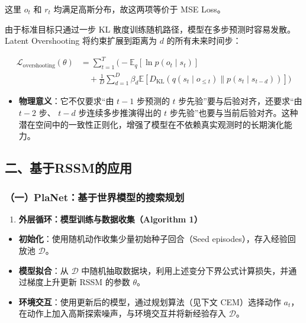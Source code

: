 这里 \(o_t\) 和 \(r_t\) 均满足高斯分布，故这两项等价于 MSE Loss。

由于标准目标只通过一步 KL 散度训练随机路径，模型在多步预测时容易发散。Latent Overshooting 将约束扩展到距离为 \(d\) 的所有未来时间步：

\[
\begin{aligned}
\mathcal{L}_{\mathrm{overshooting}}(\theta)
&=
\sum_{t=1}^{T}
\Biggl(
-\mathbb{E}_{q}\left[\ln p(o_t \mid s_t)\right]
\\
&\quad+
\frac{1}{D}
\sum_{d=1}^{D}
\beta_d
\mathbb{E}
\left[
D_{\mathrm{KL}}\left(
q(s_t \mid o_{\le t})
\parallel
p(s_t \mid s_{t-d})
\right)
\right]
\Biggr)
\end{aligned}
\]

\begin{itemize}
\tightlist
\item
  \textbf{物理意义}：它不仅要求``由 \(t - 1\) 步预测的 \(t\) 步先验''要与后验对齐，还要求``由 \(t - 2\) 步、 \(t - d\) 步连续多步推演得出的 \(t\) 步先验''也要与当前后验对齐。这种潜在空间中的一致性正则化，增强了模型在不依赖真实观测时的长期演化能力。
\end{itemize}

\hypertarget{ux4e8cux57faux4e8erssmux7684ux5e94ux7528}{%
\subsection{二、基于RSSM的应用}\label{ux4e8cux57faux4e8erssmux7684ux5e94ux7528}}

\hypertarget{ux4e00planetux57faux4e8eux4e16ux754cux6a21ux578bux7684ux641cux7d22ux89c4ux5212}{%
\subsubsection{（一）PlaNet：基于世界模型的搜索规划}\label{ux4e00planetux57faux4e8eux4e16ux754cux6a21ux578bux7684ux641cux7d22ux89c4ux5212}}

\begin{enumerate}
\def\labelenumi{\arabic{enumi}.}
\tightlist
\item
  \textbf{外层循环：模型训练与数据收集（Algorithm 1）}
\end{enumerate}

\begin{itemize}
\tightlist
\item
  \textbf{初始化}：使用随机动作收集少量初始种子回合（Seed episodes），存入经验回放池 \(\mathcal{D}\)。
\item
  \textbf{模型拟合}：从 \(\mathcal{D}\) 中随机抽取数据块，利用上述变分下界公式计算损失，并通过梯度上升更新 RSSM 的参数 \(\theta\)。
\item
  \textbf{环境交互}：使用更新后的模型，通过规划算法（见下文 CEM）选择动作 \(a_t\)，在动作上加入高斯探索噪声，与环境交互并将新经验存入 \(\mathcal{D}\)。
\end{itemize}

